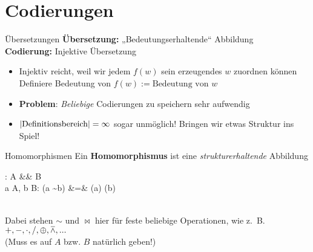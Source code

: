 \section{Codierungen}

\begin{frame}{Übersetzungen}
	\textbf{Übersetzung:} „Bedeutungserhaltende“ Abbildung \\[0.5em] \pause
	\textbf{Codierung:} Injektive Übersetzung \\ \pause
	\begin{itemize}
		\item Injektiv reicht, weil wir jedem $f(w)$ sein erzeugendes $w$ zuordnen können
		\implitem Definiere Bedeutung von $f(w) := \text{Bedeutung von } w$
	\end{itemize}
	
	\pause
	\begin{itemize}
		\item \textbf{Problem}: \emph{Beliebige} Codierungen zu speichern sehr aufwendig
		\item $\left\lvert \text{Definitionsbereich} \right\rvert = \infty$ \impl sogar unmöglich!
		\implitem Bringen wir etwas Struktur ins Spiel!
	\end{itemize}
\end{frame}

\begin{frame}{Homomorphismen}
	Ein \textbf{Homomorphismus} ist eine \textit{strukturerhaltende} Abbildung \\ \pause
	\begin{threealign}
		\Phi : A &\functionto& B \\
		 \forall a \in A, b \in B: \quad  \Phi(a \sim b) &=& \Phi(a) \bowtie \Phi(b)
	\end{threealign}
	\medskip \\
	Dabei stehen $\sim$ und $\bowtie$ hier für feste beliebige Operationen, wie z.~B. $+, -, \cdot, /, \oplus, \barwedge, ...$ \\
	(Muss es auf $A$ bzw. $B$ natürlich geben!)
\end{frame}

